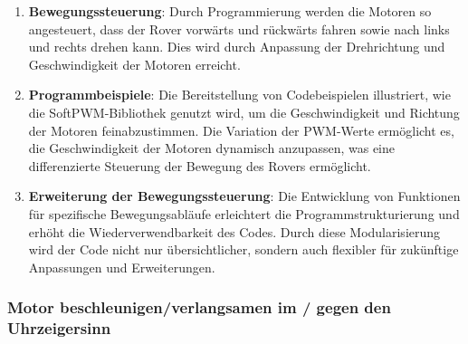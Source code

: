 \documentclass{vorlage-design-main}
\begin{document}
\begin{enumerate}
\def\labelenumi{\arabic{enumi}.}

\item
  \textbf{Bewegungssteuerung}: Durch Programmierung werden die Motoren
  so angesteuert, dass der Rover vorwärts und rückwärts fahren sowie
  nach links und rechts drehen kann. Dies wird durch Anpassung der
  Drehrichtung und Geschwindigkeit der Motoren erreicht.
\item
  \textbf{Programmbeispiele}: Die Bereitstellung von Codebeispielen
  illustriert, wie die SoftPWM-Bibliothek genutzt wird, um die
  Geschwindigkeit und Richtung der Motoren feinabzustimmen. Die
  Variation der PWM-Werte ermöglicht es, die Geschwindigkeit der Motoren
  dynamisch anzupassen, was eine differenzierte Steuerung der Bewegung
  des Rovers ermöglicht.
\item
  \textbf{Erweiterung der Bewegungssteuerung}: Die Entwicklung von
  Funktionen für spezifische Bewegungsabläufe erleichtert die
  Programmstrukturierung und erhöht die Wiederverwendbarkeit des Codes.
  Durch diese Modularisierung wird der Code nicht nur übersichtlicher,
  sondern auch flexibler für zukünftige Anpassungen und Erweiterungen.
\end{enumerate}

\hypertarget{motor-beschleunigenverlangsamen-im-gegen-den-uhrzeigersinn}{%
\subsubsection{Motor beschleunigen/verlangsamen im / gegen den
Uhrzeigersinn}\label{motor-beschleunigenverlangsamen-im-gegen-den-uhrzeigersinn}}
\end{document}
